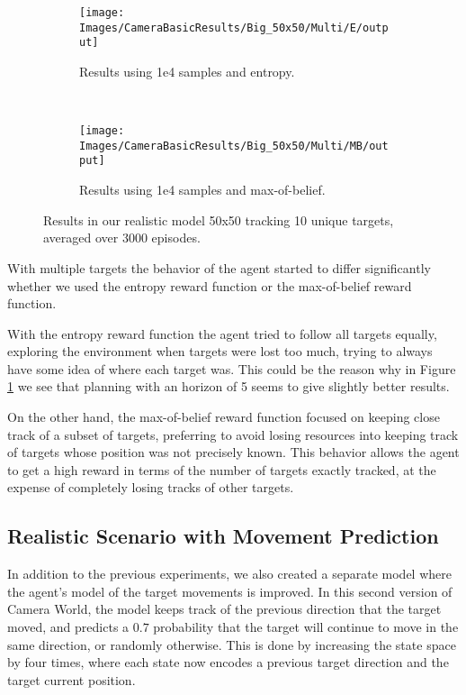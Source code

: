 \begin{figure}[ht!]
        \centering
        \begin{subfigure}[t]{0.5\textwidth}
                \texttt{[image: Images/CameraBasicResults/Big\_50x50/Multi/E/output]}
                \caption{Results using 1e4 samples and entropy.}
                \label{fig:cwb4e10}
        \end{subfigure}%
        ~ %
        \begin{subfigure}[t]{0.5\textwidth}
                \texttt{[image: Images/CameraBasicResults/Big\_50x50/Multi/MB/output]}
                \caption{Results using 1e4 samples and max-of-belief.}
                \label{fig:cwb5mb10}
        \end{subfigure}
        \caption{Results in our realistic model 50x50 tracking 10 unique targets, averaged over 3000 episodes.}
        \label{fig:cwb10}
\end{figure}

With multiple targets the behavior of the agent started to differ significantly whether we used the
entropy reward function or the max-of-belief reward function.

With the entropy reward function the agent tried to follow all targets equally, exploring the
environment when targets were lost too much, trying to always have some idea of where each target
was. This could be the reason why in Figure \ref{fig:cwb4e10} we see that planning with an horizon
of 5 seems to give slightly better results.

On the other hand, the max-of-belief reward function focused on keeping close track of a subset of
targets, preferring to avoid losing resources into keeping track of targets whose position was not
precisely known. This behavior allows the agent to get a high reward in terms of the number of
targets exactly tracked, at the expense of completely losing tracks of other targets.

\subsection{Realistic Scenario with Movement Prediction}

In addition to the previous experiments, we also created a separate model where the agent's model of
the target movements is improved. In this second version of Camera World, the model keeps track of
the previous direction that the target moved, and predicts a $0.7$ probability that the target will
continue to move in the same direction, or randomly otherwise. This is done by increasing the state
space by four times, where each state now encodes a previous target direction and the target current
position.

